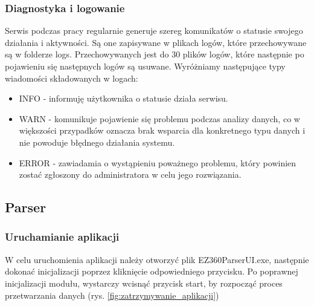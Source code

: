 \documentclass[a4paper]{book}
\begin{document}
\subsubsection{Diagnostyka i logowanie}
Serwis podczas pracy regularnie generuje szereg komunikatów o statusie swojego działania i aktywności.
Są one zapisywane w plikach logów, które przechowywane są w folderze logs. Przechowywanych jest do 30 plików logów, które następnie po pojawieniu się następnych logów są usuwane.
Wyróżniamy następujące typy wiadomości składowanych w logach:
\begin{itemize}
	\item INFO - informuję użytkownika o statusie działa serwisu.
	\item WARN - komunikuje pojawienie się problemu podczas analizy danych, co w większości przypadków oznacza brak wsparcia dla konkretnego typu danych i nie powoduje błędnego działania systemu.
	\item ERROR - zawiadamia o wystąpieniu poważnego problemu, który powinien zostać zgłoszony do administratora w celu jego rozwiązania.
\end{itemize}
\subsection{Parser}
\subsubsection{Uruchamianie aplikacji}
W celu uruchomienia aplikacji należy otworzyć plik EZ360ParserUI.exe, następnie dokonać inicjalizacji poprzez kliknięcie odpowiedniego przycisku.
Po poprawnej inicjalizacji modułu, wystarczy wcisnąć przycisk start, by rozpocząć proces przetwarzania danych (rys. \ref{fig:zatrzymywanie_aplikacji})
\end{document}
